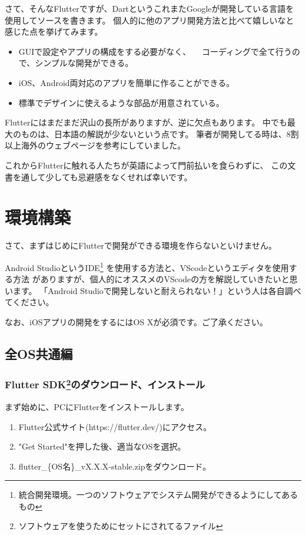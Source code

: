 \documentclass{jsarticle}
\begin{document}
        さて、そんなFlutterですが、DartというこれまたGoogleが開発している言語を使用してソースを書きます。
        個人的に他のアプリ開発方法と比べて嬉しいなと感じた点を挙げてみます。

        \begin{itemize}
            \item GUIで設定やアプリの構成をする必要がなく、
                　コーディングで全て行うので、シンプルな開発ができる。
            \item iOS、Android両対応のアプリを簡単に作ることができる。
            \item 標準でデザインに使えるような部品が用意されている。
        \end{itemize}

        Flutterにはまだまだ沢山の長所がありますが、逆に欠点もあります。
        中でも最大のものは、日本語の解説が少ないという点です。
        筆者が開発してる時は、8割以上海外のウェブページを参考にしていました。
        
        これからFlutterに触れる人たちが英語によって門前払いを食らわずに、
        この文書を通して少しても忌避感をなくせれば幸いです。

    \section*{環境構築}
        さて、まずはじめにFlutterで開発ができる環境を作らないといけません。

        Android StudioというIDE\footnote{統合開発環境。一つのソフトウェアでシステム開発ができるようにしてあるもの}
        を使用する方法と、VScodeというエディタを使用する方法
        がありますが、個人的にオススメのVScodeの方を解説していきたいと思います。
        「Android Studioで開発しないと耐えられない！」という人は各自調べてください。

        なお、iOSアプリの開発をするにはOS Xが必須です。ご了承ください。

        \subsection*{全OS共通編}
            \subsubsection*{Flutter SDK\footnote{ソフトウェアを使うためにセットにされてるファイル}のダウンロード、インストール}
                まず始めに、PCにFlutterをインストールします。
                \begin{enumerate}
                    \item Flutter公式サイト(https://flutter.dev/)にアクセス。
                    \item "Get Started"を押した後、適当なOSを選択。
                    \item flutter\_\{OS名\}\_vX.X.X-stable.zipをダウンロード。
                \end{enumerate}
\end{document}
